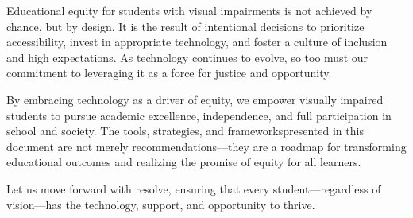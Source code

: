 Educational equity for students with visual impairments is not achieved by chance, but by design. It is the result of intentional decisions to prioritize accessibility, invest in appropriate technology, and foster a culture of inclusion and high expectations. As technology continues to evolve, so too must our commitment to leveraging it as a force for justice and opportunity.

By embracing technology as a driver of equity, we empower visually impaired students to pursue academic excellence, independence, and full participation in school and society. The tools, strategies, and frameworkspresented in this document are not merely recommendations—they are a roadmap for transforming educational outcomes and realizing the promise of equity for all learners.

Let us move forward with resolve, ensuring that every student—regardless of vision—has the technology, support, and opportunity to thrive.
